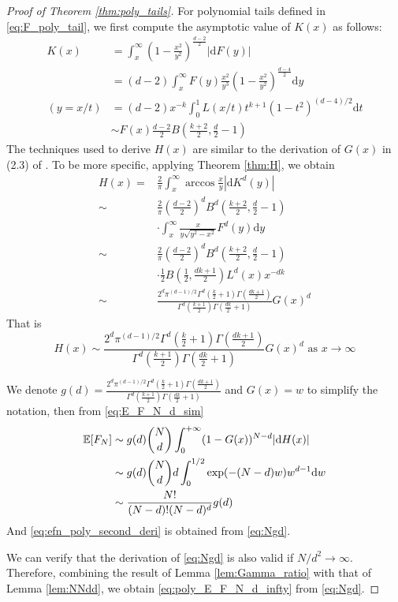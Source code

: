\documentclass[conference,a4paper]{IEEEtran}
\def\E{\mathbb{E}}
\def\dd{\mathrm{d}}
\begin{document}
\begin{proof}[Proof of Theorem \ref{thm:poly_tails}]
For polynomial tails defined in \eqref{eq:F_poly_tail},
we first compute the asymptotic value of $K(x)$
as follows:
\begin{align*}
     K(x) & = \int_x^{\infty} (1-\frac{x^2}{y^2})^{\frac{d-2}{2}} |\dd F(y)| \\
     &= (d-2)\int_x^{\infty} F(y)\frac{x^2}{y^3} (1-\frac{x^2}{y^2})^{\frac{d-4}{2}} \dd y\\
     (y=x/t) &= (d-2)x^{-k} \int_0^{1} L(x/t) t^{k+1} (1-t^2)^{(d-4)/2}\dd t \\
     & \sim F(x) \frac{d-2}{2} B\left(\frac{k+2}{2}, \frac{d}{2}-1\right) 
\end{align*}
The techniques used to derive $H(x)$ are similar to the derivation of $G(x)$
in (2.3) of \cite{carnal1970konvexe}.
To be more specific, applying Theorem \ref{thm:H}, we obtain
\begin{align*}
     H(x) =& \frac{2}{\pi}
     \int_x^{\infty} \arccos\frac{x}{y}
     |\dd K^d(y)| \\
     \sim& \frac{2}{\pi}\left(\frac{d-2}{2}\right)^d
     B^d\left(\frac{k+2}{2}, \frac{d}{2}-1\right)\\
     &\cdot\int_x^{\infty} \frac{x}{y \sqrt{y^2-x^2}} F^d(y) \dd y \\
     \sim& \frac{2}{\pi}\left(\frac{d-2}{2}\right)^d
     B^d\left(\frac{k+2}{2}, \frac{d}{2}-1\right) \\
     &\cdot\frac{1}{2}
     B\left(\frac{1}{2}, \frac{dk+1}{2}\right)L^d(x) x^{-dk} \\
     \sim& \frac{2^d \pi^{(d-1)/2}\Gamma^d(\frac{k}{2}+1)
     \Gamma(\frac{dk+1}{2})}{
         \Gamma^d(\frac{k+1}{2}) \Gamma(\frac{dk}{2}+1)} G(x)^d 
\end{align*}
That is
\begin{equation}\label{eq:H_poly_tail_exp}
     H(x) \sim \frac{2^d \pi^{(d-1)/2}\Gamma^d(\frac{k}{2}+1)
     \Gamma(\frac{dk+1}{2})}{
         \Gamma^d(\frac{k+1}{2}) \Gamma(\frac{dk}{2}+1)} G(x)^d 
         \textrm{ as } x\to \infty
\end{equation}

We denote $g(d)=\frac{2^d \pi^{(d-1)/2}\Gamma^d(\frac{k}{2}+1)
\Gamma(\frac{dk+1}{2})}{
    \Gamma^d(\frac{k+1}{2}) \Gamma(\frac{dk}{2}+1)}$
and $G(x)=w$ to simplify the notation, then from \eqref{eq:E_F_N_d_sim}
\begin{align}
     \E[F_N] &\sim g(d)\binom{N}{d} \int_0^{+\infty} 
      (1-G(x))^{N-d} |\dd H(x)| \notag \\
      &\sim g(d)\binom{N}{d}d\int_0^{1/2} \exp(-(N-d)w)w^{d-1}\dd w
      \notag \\
      &\sim \frac{N!}{(N-d)! (N-d)^d}g(d) \label{eq:Ngd}
\end{align}
And \eqref{eq:efn_poly_second_deri} is obtained from \eqref{eq:Ngd}.

We can verify that the derivation of \eqref{eq:Ngd} is also valid if $N/d^2\to \infty$.
Therefore, combining the result of Lemma \ref{lem:Gamma_ratio}
with that of Lemma \ref{lem:NNdd},
we obtain \eqref{eq:poly_E_F_N_d_infty}
from \eqref{eq:Ngd}.
\end{proof}
\end{document}
